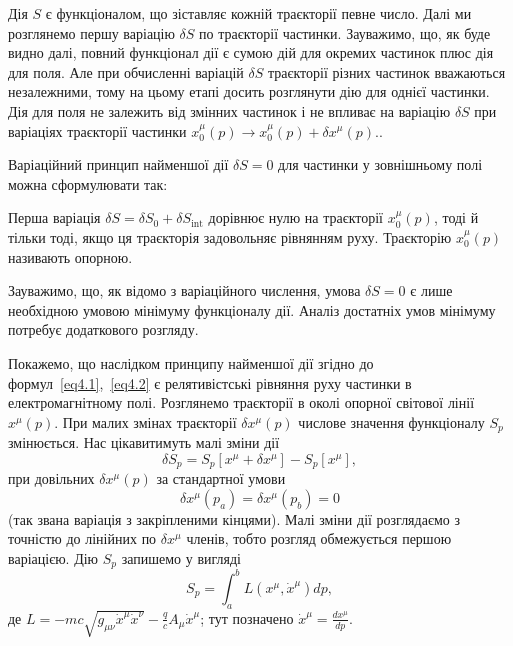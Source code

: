 Дія $S$ є функціоналом, що зіставляє кожній траєкторії певне число. Далі ми розглянемо першу варіацію $\delta S$ по траєкторії частинки. Зауважимо, що, як буде видно далі, повний функціонал дії є сумою дій для окремих частинок плюс дія для поля. Але при обчисленні варіацій $\delta S$ траєкторії різних частинок вважаються незалежними, тому на цьому етапі досить розглянути дію для однієї частинки. Дія для поля не залежить від змінних частинок і не впливає на варіацію $\delta S$ при варіаціях траєкторії частинки $x_0^\mu(p) \rightarrow x_0^\mu(p) + \delta x^\mu(p).
$.

Варіаційний принцип найменшої дії $\delta S = 0$ для частинки у зовнішньому полі можна сформулювати так:
\begin{postulate}{}
Перша варіація $\delta S = \delta S_0 +\delta S_{\text{int}}$ дорівнює нулю на траєкторії $x_0^\mu(p)$, тоді й тільки тоді, якщо ця траєкторія задовольняє рівнянням руху. Траєкторію $x_0^\mu(p)$ називають опорною.
\end{postulate}

Зауважимо, що, як відомо з варіаційного числення, умова $\delta S = 0$ є лише необхідною умовою мінімуму функціоналу дії. Аналіз достатніх умов мінімуму потребує додаткового розгляду.

Покажемо, що наслідком принципу найменшої дії згідно до формул~\eqref{eq4.1},~\eqref{eq4.2} є релятивістські рівняння руху частинки в електромагнітному полі. Розглянемо траєкторії в околі опорної світової лінії $x^\mu(p)$. При малих змінах траєкторії $\delta x^\mu(p)$ числове значення функціоналу $S_p$ змінюється. Нас цікавитимуть малі зміни дії
\begin{equation*}
\delta S_p = S_p[x^\mu + \delta x^\mu] - S_p[x^\mu],
\end{equation*}
при довільних $\delta x^\mu(p)$ за стандартної умови
\begin{equation}\label{eq4.3}
\delta x^\mu(p_a) = \delta x^\mu(p_b) = 0
\end{equation}
(так звана варіація з закріпленими кінцями). Малі зміни дії розглядаємо з точністю до лінійних по $\delta x^\mu$ членів, тобто розгляд обмежується першою варіацією. Дію $S_p$ запишемо у вигляді
\begin{equation*}
S_p = \int_a^b L(x^\mu, \dot{x}^\mu) dp,
\end{equation*}
де $L = -mc\sqrt{g_{\mu\nu}\dot{x}^\mu \dot{x}^\nu} - \frac{q}{c} A_\mu \dot{x}^\mu$; тут позначено $\dot{x}^\mu = \frac{dx^\mu}{dp}$.

